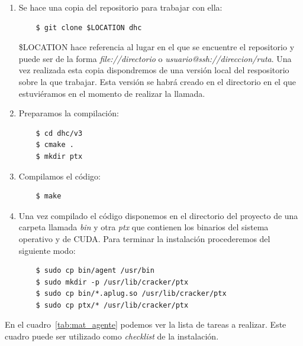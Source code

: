 \begin{enumerate}
	\item Se hace una copia del repositorio para trabajar con ella:
	
	\begin{verbatim}
	$ git clone $LOCATION dhc
	\end{verbatim}
	
	\$LOCATION hace referencia al lugar en el que se encuentre el repositorio y puede ser de la forma \emph{file://directorio} o \emph{usuario@ssh://direccion/ruta}. Una vez realizada esta copia dispondremos de una versión local del respositorio sobre la que trabajar. Esta versión se habrá creado en el directorio en el que estuviéramos en el momento de realizar la llamada.
	
	\item Preparamos la compilación:
	
	\begin{verbatim}
	$ cd dhc/v3
	$ cmake .
	$ mkdir ptx
	\end{verbatim}
	
	\item Compilamos el código:
	
	\begin{verbatim}
	$ make
	\end{verbatim}
	
	\item Una vez compilado el código disponemos en el directorio del proyecto de una carpeta llamada \emph{bin} y otra \emph{ptx} que contienen los binarios del sistema operativo y de CUDA. Para terminar la instalación procederemos del siguiente modo:
	
	\begin{verbatim}
	$ sudo cp bin/agent /usr/bin
	$ sudo mkdir -p /usr/lib/cracker/ptx
	$ sudo cp bin/*.aplug.so /usr/lib/cracker/ptx
	$ sudo cp ptx/* /usr/lib/cracker/ptx
	\end{verbatim}
\end{enumerate}

En el cuadro~\ref{tab:mat_agente} podemos ver la lista de tareas a realizar. Este cuadro puede ser utilizado como \emph{checklist} de la instalación.

